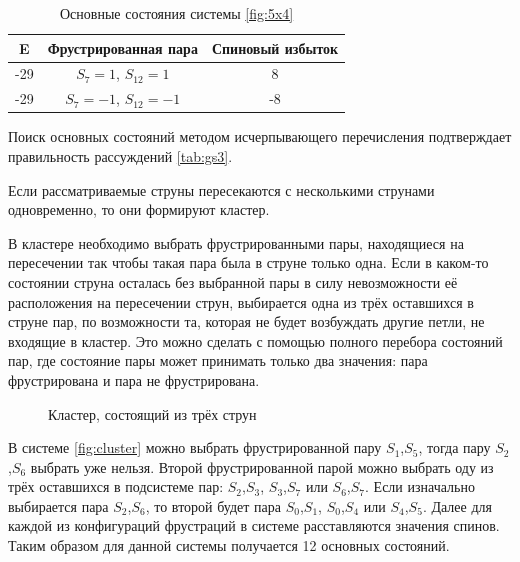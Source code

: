 \documentclass[utf8, babel, sor, jor, amsmath, amssymb, reprint]{elsarticle} %
\begin{document}
\begin{table}[h]
	\centering
	\begin{tabular}{|c|c|c|}
		\hline
		E   &   Фрустрированная пара & Спиновый избыток\\
		\hline
		-29   &  $S_7=1$, $S_{12}=1$ & 8 \\
		\hline
		-29   &   $S_7=-1$, $S_{12}=-1$ & -8 \\
		\hline
	\end{tabular}
	\caption{Основные состояния системы \eqref{fig:5x4}}
	\label{tab:gs3}
\end{table}

Поиск основных состояний методом исчерпывающего перечисления подтверждает правильность рассуждений \eqref{tab:gs3}.

Если рассматриваемые струны пересекаются с несколькими струнами одновременно, то они формируют кластер.

В кластере необходимо выбрать фрустрированными пары, находящиеся на пересечении так чтобы такая пара была в струне только одна. Если в каком-то состоянии струна осталась без выбранной пары в силу невозможности её расположения на пересечении струн, выбирается одна из трёх оставшихся в струне пар, по возможности та, которая не будет возбуждать другие петли, не входящие в кластер. Это можно сделать с помощью полного перебора состояний пар, где состояние пары может принимать только два значения: пара фрустрирована и пара не фрустрирована.

\begin{figure}[h]
	\centering
	\caption{Кластер, состоящий из трёх струн}
	\label{fig:cluster}
\end{figure}

В системе \eqref{fig:cluster}  можно выбрать фрустрированной пару $S_1$,$S_5$, тогда пару  $S_2$,$S_6$ выбрать уже нельзя. Второй фрустрированной парой можно выбрать оду из трёх оставшихся в подсистеме пар: $S_2$,$S_3$, $S_3$,$S_7$ или $S_6$,$S_7$. Если изначально выбирается пара $S_2$,$S_6$, то второй будет пара $S_0$,$S_1$, $S_0$,$S_4$ или $S_4$,$S_5$. Далее для каждой из конфигураций фрустраций в системе расставляются значения спинов. Таким образом для данной системы получается 12 основных состояний. 
\end{document}
